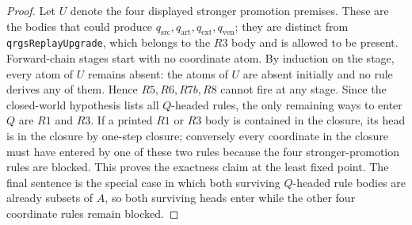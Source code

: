 \documentclass[runningheads]{llncs}
\newcommand{\qsrc}{q_{\mathrm{src}}}
\newcommand{\qart}{q_{\mathrm{art}}}
\newcommand{\qext}{q_{\mathrm{ext}}}
\newcommand{\qven}{q_{\mathrm{ven}}}
\begin{document}
\begin{proof}
Let \(U\) denote the four displayed stronger promotion premises.  These are the
bodies that could produce \(\qsrc,\qart,\qext,\qven\); they are distinct from
\texttt{qrgsReplayUpgrade}, which belongs to the \(R3\) body and is allowed to
be present.  Forward-chain stages start with no coordinate atom.  By induction
on the stage, every atom of \(U\) remains absent: the atoms of \(U\) are absent
initially and no rule derives any of them.  Hence \(R5,R6,R7b,R8\) cannot fire
at any stage.  Since the closed-world hypothesis lists all \(Q\)-headed rules,
the only remaining ways to enter \(Q\) are \(R1\) and \(R3\).  If a printed
\(R1\) or \(R3\) body is contained in the closure, its head is in the closure by
one-step closure; conversely every coordinate in the closure must have entered
by one of these two rules because the four stronger-promotion rules are blocked.
This proves the exactness claim at the least fixed point.  The final sentence is
the special case in which both surviving \(Q\)-headed rule bodies are already
subsets of \(A\), so both surviving heads enter while the other four coordinate
rules remain blocked.
\end{proof}
\end{document}
